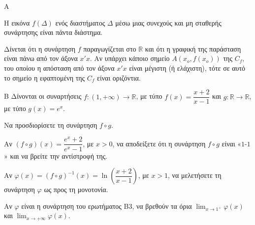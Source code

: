 \begin{thema}{Α}
\begin{erwthma}
\begin{alist}
        \item Η εικόνα $f(\Delta)$ ενός διαστήματος $\Delta$ μέσω μιας συνεχούς και μη σταθερής συνάρτησης είναι πάντα διάστημα.

        \item Δίνεται ότι η συνάρτηση $f$ παραγωγίζεται στο $\mathbb{R}$ και ότι η γραφική της παράσταση είναι πάνω από τον άξονα $x'x$. Αν υπάρχει κάποιο σημείο $A(x_o, f(x_o))$ της $C_f$, του οποίου η απόσταση από τον άξονα $x'x$ είναι μέγιστη (ή ελάχιστη), τότε σε αυτό το σημείο η εφαπτομένη της $C_f$ είναι οριζόντια.
    \end{alist}
\end{erwthma}
\end{thema}

\begin{thema}{Β}
Δίνονται οι συναρτήσεις $f: (1, +\infty) \to \mathbb{R}$, με τύπο $f(x) = \dfrac{x+2}{x-1}$ και $g: \mathbb{R} \to \mathbb{R}$, με τύπο $g(x) = e^x$.
\begin{erwthma}
    \item Να προσδιορίσετε τη συνάρτηση $f \circ g$. 

    \item Αν $(f \circ g)(x) = \dfrac{e^x + 2}{e^x - 1}$, με $x > 0$, να αποδείξετε ότι η συνάρτηση $f \circ g$ είναι «$1$-$1$» και να βρείτε την αντίστροφή της. 

    \item Αν $\varphi(x) = (f \circ g)^{-1}(x) = \ln\!\left(\dfrac{x+2}{x-1}\right)$, με $x > 1$, να μελετήσετε τη συνάρτηση $\varphi$ ως προς τη μονοτονία. 

    \item Αν $\varphi$ είναι η συνάρτηση του ερωτήματος Β3, να βρεθούν τα όρια $\displaystyle\lim_{x \to 1^+} \varphi(x)$ και $\displaystyle\lim_{x \to +\infty} \varphi(x)$. 
\end{erwthma}
\end{thema}

